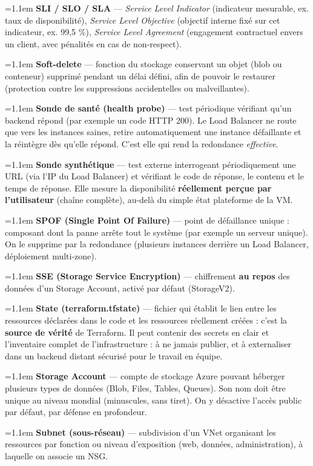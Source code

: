 \documentclass[11pt,a4paper]{article}
\newcommand{\df}[2]{%
  \par\addvspace{4pt}\needspace{2\baselineskip}%
  \hangindent=1.1em\hangafter=1
  {\sffamily\bfseries\color{azuredark}#1} — #2\par}
\begin{document}
\df{SLI / SLO / SLA}{\emph{Service Level Indicator} (indicateur mesurable, ex. taux de disponibilité), \emph{Service Level Objective} (objectif interne fixé sur cet indicateur, ex. 99,5 \%), \emph{Service Level Agreement} (engagement contractuel envers un client, avec pénalités en cas de non-respect).}

\df{Soft-delete}{fonction du stockage conservant un objet (blob ou conteneur) supprimé pendant un délai défini, afin de pouvoir le restaurer (protection contre les suppressions accidentelles ou malveillantes).}

\df{Sonde de santé (health probe)}{test périodique vérifiant qu'un backend répond (par exemple un code HTTP 200). Le Load Balancer ne route que vers les instances saines, retire automatiquement une instance défaillante et la réintègre dès qu'elle répond. C'est elle qui rend la redondance \emph{effective}.}

\df{Sonde synthétique}{test externe interrogeant périodiquement une URL (via l'IP du Load Balancer) et vérifiant le code de réponse, le contenu et le temps de réponse. Elle mesure la disponibilité \textbf{réellement perçue par l'utilisateur} (chaîne complète), au-delà du simple état plateforme de la VM.}

\df{SPOF (Single Point Of Failure)}{point de défaillance unique : composant dont la panne arrête tout le système (par exemple un serveur unique). On le supprime par la redondance (plusieurs instances derrière un Load Balancer, déploiement multi-zone).}

\df{SSE (Storage Service Encryption)}{chiffrement \textbf{au repos} des données d'un Storage Account, activé par défaut (StorageV2).}

\df{State (terraform.tfstate)}{fichier qui établit le lien entre les ressources déclarées dans le code et les ressources réellement créées : c'est la \textbf{source de vérité} de Terraform. Il peut contenir des secrets en clair et l'inventaire complet de l'infrastructure : à ne jamais publier, et à externaliser dans un backend distant sécurisé pour le travail en équipe.}

\df{Storage Account}{compte de stockage Azure pouvant héberger plusieurs types de données (Blob, Files, Tables, Queues). Son nom doit être unique au niveau mondial (minuscules, sans tiret). On y désactive l'accès public par défaut, par défense en profondeur.}

\df{Subnet (sous-réseau)}{subdivision d'un VNet organisant les ressources par fonction ou niveau d'exposition (web, données, administration), à laquelle on associe un NSG.}
\end{document}
